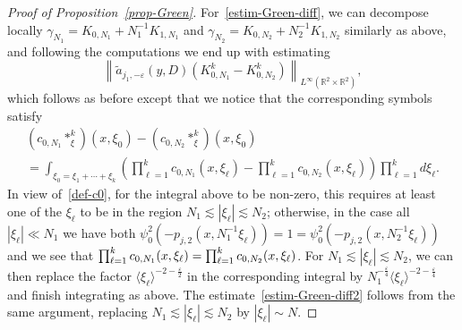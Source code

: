 \documentclass[10pt]{amsart}
\theoremstyle{definition}\newtheorem{defi}[theo]{Definition}\newtheorem{rema}[theo]{Remark}\newtheorem{exam}[theo]{Example}\newtheorem{exem}[theo]{Example}\newtheorem{nota}[theo]{Notation}
\newcommand{\R}{\mathbb{R}}
\newcommand{\eps}{\varepsilon}
\newcommand{\wt}{\widetilde}
\newcommand{\les}{\lesssim}
\newcommand{\jb}[1] {\langle #1 \rangle}
\begin{document}
\begin{proof}[Proof of Proposition~\ref{prop-Green}]
For~\eqref{estim-Green-diff}, we can decompose locally $\gamma_{N_1}=K_{0,N_1}+N_1^{-1}K_{1,N_1}$ and $\gamma_{N_2}=K_{0,N_2}+N_2^{-1}K_{1,N_2}$ similarly as above, and following the computations we end up with estimating
\begin{equation*}
\left\|\wt a_{j_1,-\eps}(y,D)\left(K_{0,N_1}^k-K_{0,N_2}^k\right)\right\|_{L^{\infty}(\R^2\times\R^2)},
\end{equation*}
which follows as before except that we notice that the corresponding symbols satisfy
\begin{multline*}
\left(c_{0,N_1}*_{\xi}^k\right)(x,\xi_0)-\left(c_{0,N_2}*_{\xi}^k\right)(x,\xi_0)\\
 = \int_{\xi_0=\xi_1+\cdots+\xi_k}\left(\prod_{\ell=1}^k c_{0,N_1}(x,\xi_\ell)-\prod_{\ell=1}^k c_{0,N_2}(x,\xi_\ell)\right)\prod_{\ell=1}^kd\xi_\ell.
\end{multline*}
In view of~\eqref{def-c0}, for the integral above to be non-zero, this requires at least one of the $\xi_\ell$ to be in the region $N_1\les |\xi_\ell|\les N_2$; otherwise, in the case all $|\xi_\ell|\ll N_1$ we have both $\psi_0^2(-p_{j,2}(x,N_1^{-1}\xi_\ell))=1=\psi_0^2(-p_{j,2}(x,N_2^{-1}\xi_\ell))$ and we see that $\prod_{\ell=1}^k c_{0,N_1}(x,\xi_\ell)\linebreak=\prod_{\ell=1}^k c_{0,N_2}(x,\xi_\ell)$. For $N_1\les |\xi_\ell|\les N_2$, we can then replace the factor $\jb{\xi_\ell}^{-2-\frac{\eps}2}$ in the corresponding integral by $N_1^{-\frac{\eps}4}\jb{\xi_\ell}^{-2-\frac{\eps}4}$ and finish integrating as above. The estimate~\eqref{estim-Green-diff2} follows from the same argument, replacing $N_1\les |\xi_\ell|\les N_2$ by $|\xi_\ell|\sim N$.
\end{proof}
\end{document}
